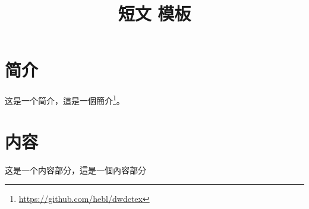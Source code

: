 \documentclass[10pt,fontset=adobe,UTF8]{ctexart}
\title{短文 模板}
\begin{document}
\maketitle

\section{简介}

这是一个简介，這是一個簡介\footnote{\url{https://github.com/hebl/dwdctex}}。

\section{内容}

这是一个内容部分，這是一個內容部分
\end{document}
